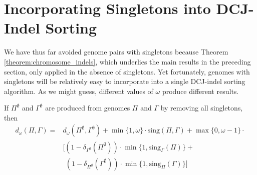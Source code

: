 \section{Incorporating Singletons into DCJ-Indel Sorting}

We have thus far avoided genome pairs with singletons because Theorem \ref{theorem:chromosome_indels}, which underlies the main results in the preceding section, only applied in the absence of singletons. Yet fortunately, genomes with singletons will be relatively easy to incorporate into a single DCJ-indel sorting algorithm. As we might guess, different values of $\omega$ produce different results.

\begin{theorem}
If $\Pi^{\emptyset}$ and $\Gamma^{\emptyset}$ are produced from genomes $\Pi$ and $\Gamma$ by removing all singletons, then
\begin{equation}
\begin{split}
d_{\omega}(\Pi, \Gamma) = & d_{\omega}(\Pi^{\emptyset}, \Gamma^{\emptyset}) + \min{\{1, \omega\}} \cdot \mathrm{sing}(\Pi, \Gamma) + \max{\{0, \omega - 1\}} \cdot\\
& \Big[ (1 - \delta_{\Gamma^{\emptyset}}(\Pi^{\emptyset}))\cdot \min{\{1, \mathrm{sing}_{\Gamma}(\Pi)\}} + \\
&\phantom{(} (1 - \delta_{\Pi^{\emptyset}}(\Gamma^{\emptyset})) \cdot \min{\{1, \mathrm{sing}_{\Pi}(\Gamma)\}}\Big]
\end{split}
\label{equation:singletons}
\end{equation}
\end{theorem}
\vspace{-\baselineskip}

